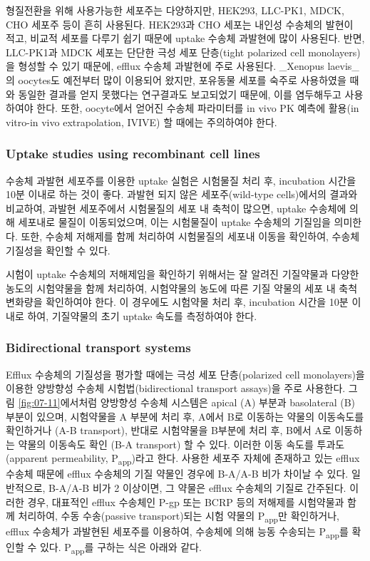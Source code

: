 \documentclass[
  11pt,
  krantz2, a4paper, twoside]{krantz}
\begin{document}
형질전환을 위해 사용가능한 세포주는 다양하지만, HEK293, LLC-PK1, MDCK,
CHO 세포주 등이 흔히 사용된다. HEK293과 CHO 세포는 내인성 수송체의
발현이 적고, 비교적 세포를 다루기 쉽기 때문에 uptake 수송체 과발현에
많이 사용된다. 반면, LLC-PK1과 MDCK 세포는 단단한 극성 세포 단층(tight
polarized cell monolayers)을 형성할 수 있기 때문에, efflux 수송체
과발현에 주로 사용된다. \_Xenopus laevis\_의 oocytes도 예전부터 많이
이용되어 왔지만, 포유동물 세포를 숙주로 사용하였을 때와 동일한 결과를
얻지 못했다는 연구결과도 보고되었기 때문에, 이를 염두해두고 사용하여야
한다. 또한, oocyte에서 얻어진 수송체 파라미터를 in vivo PK 예측에
활용(in vitro-in vivo extrapolation, IVIVE) 할 때에는 주의하여야 한다.

\subsubsection{Uptake studies using recombinant cell lines}\label{uptake-studies-using-recombinant-cell-lines}

수송체 과발현 세포주를 이용한 uptake 실험은 시험물질 처리 후, incubation
시간을 10분 이내로 하는 것이 좋다. 과발현 되지 않은 세포주(wild-type
cells)에서의 결과와 비교하여, 과발현 세포주에서 시험물질의 세포 내
축척이 많으면, uptake 수송체에 의해 세포내로 물질이 이동되었으며, 이는
시험물질이 uptake 수송체의 기질임을 의미한다. 또한, 수송체 저해제를 함께
처리하여 시험물질의 세포내 이동을 확인하여, 수송체 기질성을 확인할 수
있다.

시험이 uptake 수송체의 저해제임을 확인하기 위해서는 잘 알려진 기질약물과
다양한 농도의 시험약물을 함께 처리하여, 시험약물의 농도에 따른 기질
약물의 세포 내 축척 변화량을 확인하여야 한다. 이 경우에도 시험약물 처리
후, incubation 시간을 10분 이내로 하여, 기질약물의 초기 uptake 속도를
측정하여야 한다.

\subsubsection{Bidirectional transport systems}\label{bidirectional-transport-systems}

Efflux 수송체의 기질성을 평가할 때에는 극성 세포 단층(polarized cell
monolayers)을 이용한 양방향성 수송체 시험법(bidirectional transport
assays)을 주로 사용한다. 그림 \ref{fig:07-11}에서처럼 양방향성 수송체
시스템은 apical (A) 부분과 basolateral (B) 부분이 있으며, 시험약물을 A
부분에 처리 후, A에서 B로 이동하는 약물의 이동속도를 확인하거나 (A-B
transport), 반대로 시험약물을 B부분에 처리 후, B에서 A로 이동하는 약물의
이동속도 확인 (B-A transport) 할 수 있다. 이러한 이동 속도를
투과도(apparent permeability, P\textsubscript{app})라고 한다. 사용한 세포주 자체에
존재하고 있는 efflux 수송체 때문에 efflux 수송체의 기질 약물인 경우에
B-A/A-B 비가 차이날 수 있다. 일반적으로, B-A/A-B 비가 2 이상이면, 그
약물은 efflux 수송체의 기질로 간주된다. 이러한 경우, 대표적인 efflux
수송체인 P-gp 또는 BCRP 등의 저해제를 시험약물과 함께 처리하여, 수동
수송(passive transport)되는 시험 약물의 P\textsubscript{app}만 확인하거나, efflux
수송체가 과발현된 세포주를 이용하여, 수송체에 의해 능동 수송되는
P\textsubscript{app}를 확인할 수 있다. P\textsubscript{app}를 구하는 식은 아래와 같다.
\end{document}
